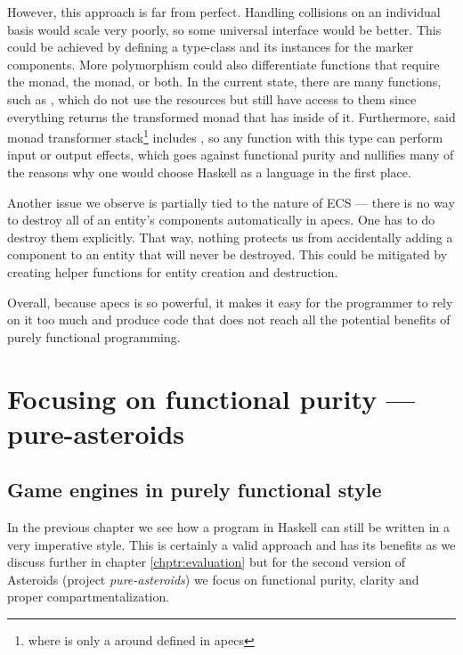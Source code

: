 \documentclass[
  digital, %
  color,   %
  table,   %
  oneside, %
  lof,     %
  lot,     %
]{fithesis3}
\begin{document}
However, this approach is far from perfect. Handling collisions on an
individual basis would scale very poorly, so some universal interface would be better.
This could be achieved by defining a type-class and its instances for the marker components.
More polymorphism could also differentiate functions that require the
 monad, the  monad, or both.
In the current state, there are many functions, such as ,
which do not use the resources but still have access to them since
everything returns the transformed  monad
that has  inside of it. Furthermore,
said monad transformer stack\footnote{
where  is only a 
around  defined in apecs
}
includes , so any function with this type can perform
input or output effects, which goes against functional purity and nullifies
many of the reasons why one would choose Haskell as a language in the first place.

Another issue we observe is partially tied to the nature of ECS --- there
is no way to destroy all of an entity's components automatically in apecs.
One has to do destroy them explicitly. That way, nothing protects us
from accidentally adding a component to an entity that will never be destroyed.
This could be mitigated by creating helper functions for entity creation and destruction.

Overall, because apecs is so powerful, it makes it easy for the programmer to rely
on it too much and produce code that does not reach all the potential
benefits of purely functional programming.




\chapter{Focusing on functional purity --- pure-asteroids}
\label{chptr:purity}

\section{Game engines in purely functional style}
\label{sect:pureengines}

In the previous chapter we see how a program in Haskell can still be
written in a very imperative style. 
This is certainly a valid approach and has its benefits as we discuss
further in chapter \ref{chptr:evaluation} but for the second version of
Asteroids (project \emph{pure-asteroids}) we focus on functional purity,
clarity and proper compartmentalization.
\end{document}

